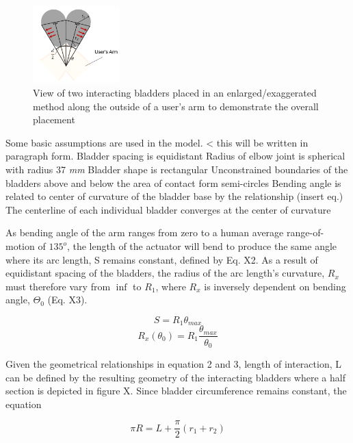 \documentclass[letterpaper, 10 pt, conference]{ieeeconf}  %
\begin{document}
\begin{figure}[t!]
\centering
\includegraphics[width=0.3\textwidth]{model1.PNG}
\caption{View of two interacting bladders placed in an enlarged/exaggerated method along the outside of a user’s arm to demonstrate the overall placement}
\label{fig:mod1}
\end{figure}

Some basic assumptions are used in the model. < this will be written in paragraph form.
Bladder spacing is equidistant
Radius of elbow joint is spherical with radius 37 \textit{mm}
Bladder shape is rectangular 
Unconstrained boundaries of the bladders above and below the area of contact form semi-circles
Bending angle is related to center of curvature of the bladder base by the relationship 
(insert eq.) 
The centerline of each individual bladder converges at the center of curvature

	As bending angle of the arm ranges from zero to a human average range-of-motion  of $135^o$, the length of the actuator will bend to produce the same angle where its arc length, S remains constant, defined by Eq. X2. As a result of equidistant spacing of the bladders, the radius of the arc length’s curvature, $R_x$ must therefore vary from ${\inf}$ to $R_{1}$, where $R_x$ is inversely dependent on bending angle,  $\Theta_0$ (Eq. X3).
 
\begin{equation}
	S = R_1\theta_{max}
\end{equation}
\begin{equation}
	R_x(\theta_0) = R_1\frac{\theta_{max}}{\theta_0}
\end{equation}

Given the geometrical relationships in equation 2 and 3, length of interaction, L can be defined by the resulting geometry of the interacting bladders where a half section is depicted in figure X. Since bladder circumference remains constant, the equation

\begin{equation}\label{eq. X4}
	\pi R = L + \frac{\pi}{2}(r_1+r_2)
\end{equation}
\end{document}
